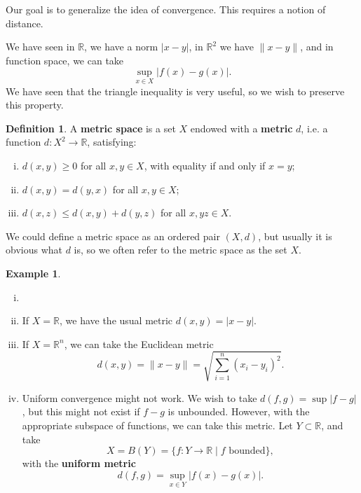 \documentclass[12pt]{article}
\theoremstyle{definition}
\newtheorem{definition}{Definition}[section]
\newtheorem{example}{Example}[section]
\theoremstyle{remark}
\begin{document}
Our goal is to generalize the idea of convergence. This requires a notion of distance.

We have seen in $\mathbb{R}$, we have a norm $|x - y|$, in $\mathbb{R}^2$ we have $\|x - y\|$, and in function space, we can take
\[
	\sup_{x \in X}|f(x) - g(x)|
.\]
We have seen that the triangle inequality is very useful, so we wish to preserve this property.

\begin{definition}
	A \textbf{metric space} is a set $X$ endowed with a \textbf{metric} $d$, i.e. a function $d : X^2 \to \mathbb{R}$, satisfying:
	\begin{enumerate}[(i)]
		\item $d(x, y) \geq 0$ for all $x, y \in X$, with equality if and only if $x = y$;
		\item $d(x, y) = d(y, x)$ for all $x, y \in X$;
		\item $d(x, z) \leq d(x, y) + d(y, z)$ for all $x, y z \in X$.
	\end{enumerate}
\end{definition}

We could define a metric space as an ordered pair $(X, d)$, but usually it is obvious what $d$ is, so we often refer to the metric space as the set $X$.

\begin{adjustbox}{minipage = \columnwidth - 25.5pt, margin=1em, frame=1pt, margin=0em}
\begin{example}
	\begin{enumerate}[(i)]
		\item[]
		\item If $X = \mathbb{R}$, we have the usual metric $d(x, y) = |x - y|$.
		\item If $X = \mathbb{R}^{n}$, we can take the Euclidean metric
			\[
				d(x, y) = \|x - y\| = \sqrt{\sum_{i = 1}^{n}(x_{i} - y_i)^2}
			.\]
		\item Uniform convergence might not work. We wish to take $d(f, g) = \sup|f - g|$, but this might not exist if $f - g$ is unbounded. However, with the appropriate subspace of functions, we can take this metric. Let $Y \subset \mathbb{R}$, and take
			\[
				X = B(Y) = \{f : Y \to \mathbb{R} \mid f \text{ bounded}\}
			,\]
			with the \textbf{uniform metric}
			\[
				d(f, g) = \sup_{x \in Y}|f(x) - g(x)|
			.\]
	\end{enumerate}
	
\end{example}

\end{adjustbox}
\end{document}
